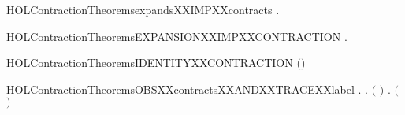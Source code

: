 \newcommand{\HOLContractionTheoremscontractsXXWEAKXXTRANSXXtauYY}{\UseVerbatim{HOLContractionTheoremscontractsXXWEAKXXTRANSXXtauYY}}
\begin{SaveVerbatim}{HOLContractionTheoremsexpandsXXIMPXXcontracts}
\HOLTokenTurnstile{} \HOLSymConst{\HOLTokenForall{}} .    \HOLSymConst{\HOLTokenImp{}}   
\end{SaveVerbatim}
\newcommand{\HOLContractionTheoremsexpandsXXIMPXXcontracts}{\UseVerbatim{HOLContractionTheoremsexpandsXXIMPXXcontracts}}
\begin{SaveVerbatim}{HOLContractionTheoremsEXPANSIONXXIMPXXCONTRACTION}
\HOLTokenTurnstile{} \HOLSymConst{\HOLTokenForall{}}.   \HOLSymConst{\HOLTokenImp{}}  
\end{SaveVerbatim}
\newcommand{\HOLContractionTheoremsEXPANSIONXXIMPXXCONTRACTION}{\UseVerbatim{HOLContractionTheoremsEXPANSIONXXIMPXXCONTRACTION}}
\begin{SaveVerbatim}{HOLContractionTheoremsIDENTITYXXCONTRACTION}
\HOLTokenTurnstile{}  \ensuremath{(}\HOLSymConst{\ensuremath{=}}\ensuremath{)}
\end{SaveVerbatim}
\newcommand{\HOLContractionTheoremsIDENTITYXXCONTRACTION}{\UseVerbatim{HOLContractionTheoremsIDENTITYXXCONTRACTION}}
\begin{SaveVerbatim}{HOLContractionTheoremsOBSXXcontractsXXANDXXTRACEXXlabel}
\HOLTokenTurnstile{} \HOLSymConst{\HOLTokenForall{}} .
          \HOLSymConst{\HOLTokenImp{}}
       \HOLSymConst{\HOLTokenForall{}}  .
               \HOLSymConst{\HOLTokenConj{}}  \ensuremath{(} \ensuremath{)}  \HOLSymConst{\HOLTokenImp{}}
           \HOLSymConst{\HOLTokenExists{}} .
                   \HOLSymConst{\HOLTokenConj{}}    \HOLSymConst{\HOLTokenConj{}}
                 \HOLSymConst{\HOLTokenLeq{}}   \HOLSymConst{\HOLTokenConj{}}
                \ensuremath{(} \ensuremath{)} 
\end{SaveVerbatim}
